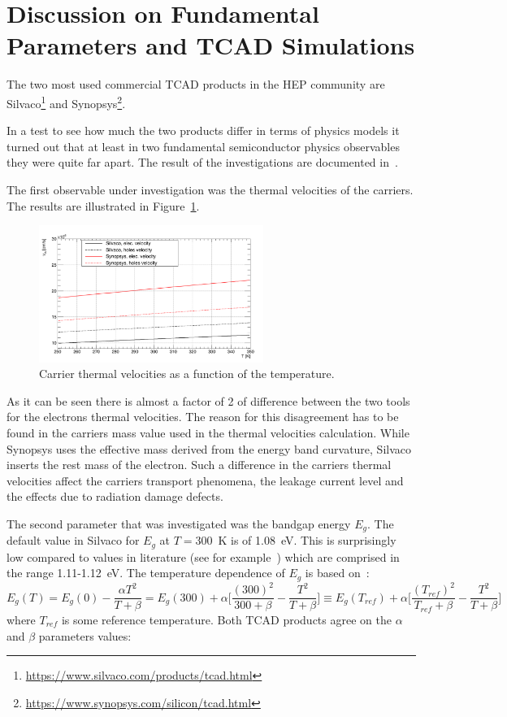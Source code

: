 \section{Discussion on Fundamental Parameters and TCAD Simulations}
The two most used commercial TCAD products in the HEP community are Silvaco\footnote{\url{https://www.silvaco.com/products/tcad.html}} and Synopsys\footnote{\url{https://www.synopsys.com/silicon/tcad.html}}.

In a test to see how much the two products differ in terms of physics models it turned out 
that at least in two fundamental semiconductor physics observables they were quite far apart. 
The result of the investigations are documented in~\cite{bomben_rd50_Torino}.

The first observable under investigation was the thermal velocities of the carriers. The results 
are illustrated in Figure~\ref{fig:vtherm}.

\begin{figure}[!htbp]
\centering
\includegraphics[width=0.65\textwidth]{vtherm}
\caption{\label{fig:vtherm}Carrier thermal velocities as a function of the temperature.}
\end{figure}
As it can be seen there is almost a factor of 2 of difference between the two tools for the electrons 
thermal velocities. The reason for this disagreement has to be found in the carriers  mass value
used in the thermal velocities calculation. While Synopsys uses the effective  mass derived 
from the energy band curvature, Silvaco inserts the rest mass of the electron. 
Such a difference in the  carriers thermal velocities affect the carriers transport phenomena, 
the leakage current level and the effects due to radiation damage defects. 
 
 The second parameter that was investigated was the bandgap energy $E_g$. The default value in 
 Silvaco for $E_g$ at $T=$300~K is of 1.08~eV. This is surprisingly low compared to values in literature 
 (see for example~\cite{Lutz:411172,Sze1981,Wang1989,Shockley}) which are comprised 
 in the range 1.11-1.12~eV.
The temperature dependence of $E_g$ is based on~\cite{Sze1981}:
\begin{equation}
E_g(T)=E_g(0) -\dfrac{\alpha T^2}{T+\beta}=E_g(300)+\alpha\Bigg[ \dfrac{(300)^2}{300+\beta}-\dfrac{T^2}{T+\beta}  \Bigg] \equiv E_g(T_{ref})+\alpha\Bigg[ \dfrac{(T_{ref})^2}{T_{ref}+\beta}-\dfrac{T^2}{T+\beta}  \Bigg] 
\label{eq:EgT}
\end{equation}
where $T_{ref}$ is some reference temperature.
Both TCAD products agree on the $\alpha$ and $\beta$ parameters values:

